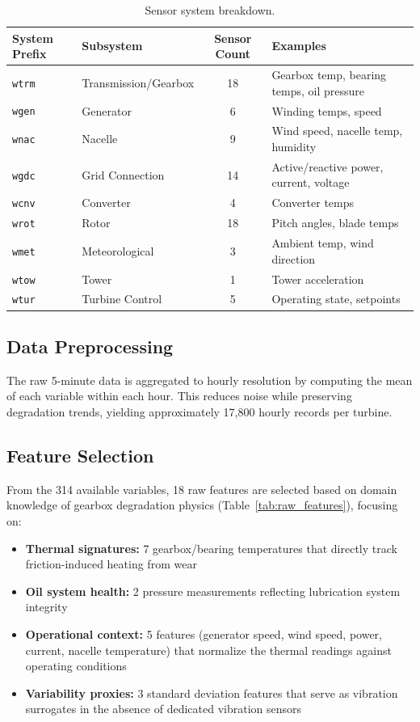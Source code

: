 \documentclass[preprint,12pt]{elsarticle}
\begin{document}
\begin{table}[H]
\centering
\caption{Sensor system breakdown.}
\label{tab:sensor_systems}
\begin{tabular}{llcl}
\toprule
System Prefix & Subsystem & Sensor Count & Examples \\
\midrule
\texttt{wtrm} & Transmission/Gearbox & 18 & Gearbox temp, bearing temps, oil pressure \\
\texttt{wgen} & Generator & 6 & Winding temps, speed \\
\texttt{wnac} & Nacelle & 9 & Wind speed, nacelle temp, humidity \\
\texttt{wgdc} & Grid Connection & 14 & Active/reactive power, current, voltage \\
\texttt{wcnv} & Converter & 4 & Converter temps \\
\texttt{wrot} & Rotor & 18 & Pitch angles, blade temps \\
\texttt{wmet} & Meteorological & 3 & Ambient temp, wind direction \\
\texttt{wtow} & Tower & 1 & Tower acceleration \\
\texttt{wtur} & Turbine Control & 5 & Operating state, setpoints \\
\bottomrule
\end{tabular}
\end{table}

\subsection{Data Preprocessing}

The raw 5-minute data is aggregated to hourly resolution by computing the mean of each variable within each hour. This reduces noise while preserving degradation trends, yielding approximately 17,800 hourly records per turbine.

\subsection{Feature Selection}

From the 314 available variables, 18 raw features are selected based on domain knowledge of gearbox degradation physics (Table~\ref{tab:raw_features}), focusing on:

\begin{itemize}
    \item \textbf{Thermal signatures:} 7 gearbox/bearing temperatures that directly track friction-induced heating from wear
    \item \textbf{Oil system health:} 2 pressure measurements reflecting lubrication system integrity
    \item \textbf{Operational context:} 5 features (generator speed, wind speed, power, current, nacelle temperature) that normalize the thermal readings against operating conditions
    \item \textbf{Variability proxies:} 3 standard deviation features that serve as vibration surrogates in the absence of dedicated vibration sensors
\end{itemize}
\end{document}
